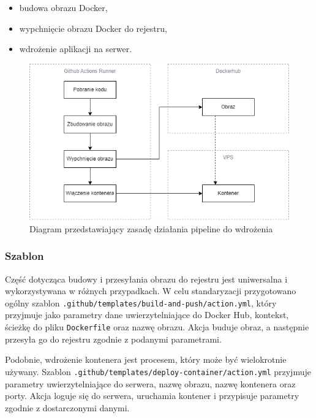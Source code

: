 \documentclass{article}
\begin{document}
\begin{itemize}
    \item budowa obrazu Docker,
    \item wypchnięcie obrazu Docker do rejestru,
    \item wdrożenie aplikacji na serwer.
\end{itemize}

\begin{figure}[H]
    \centering
    \includegraphics[width=0.75\linewidth]{githubActionsSchema.png}
    \caption{Diagram przedstawiający zasadę działania pipeline do wdrożenia}
    \label{fig:enter-label}
\end{figure}

\subsubsection{Szablon}

Część dotycząca budowy i przesyłania obrazu do rejestru jest uniwersalna i wykorzystywana w różnych przypadkach. W celu standaryzacji przygotowano ogólny szablon \lstinline|.github/templates/build-and-push/action.yml|, który przyjmuje jako parametry dane uwierzytelniające do Docker Hub, kontekst, ścieżkę do pliku \lstinline|Dockerfile| oraz nazwę obrazu. Akcja buduje obraz, a następnie przesyła go do rejestru zgodnie z podanymi parametrami.

Podobnie, wdrożenie kontenera jest procesem, który może być wielokrotnie używany. Szablon \lstinline|.github/templates/deploy-container/action.yml| przyjmuje parametry uwierzytelniające do serwera, nazwę obrazu, nazwę kontenera oraz porty. Akcja loguje się do serwera, uruchamia kontener i przypisuje parametry zgodnie z dostarczonymi danymi.
\end{document}
